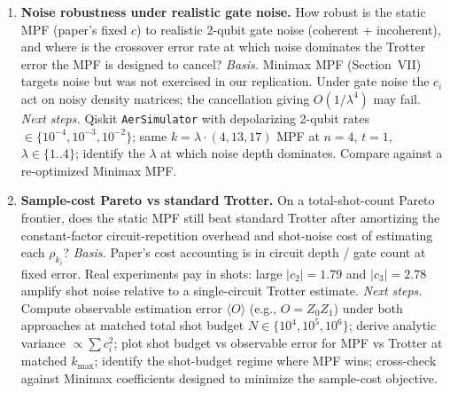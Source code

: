 \begin{enumerate}
\item \textbf{Noise robustness under realistic gate noise.}
How robust is the static MPF (paper's fixed $c$) to realistic 2-qubit gate noise (coherent +
incoherent), and where is the crossover error rate at which noise dominates the Trotter error the
MPF is designed to cancel?
\emph{Basis.} Minimax MPF (Section~VII) targets noise but was not exercised in our replication.
Under gate noise the $c_i$ act on noisy density matrices; the cancellation giving $O(1/\lambda^4)$
may fail.
\emph{Next steps.} Qiskit \texttt{AerSimulator} with depolarizing 2-qubit rates
$\in \{10^{-4}, 10^{-3}, 10^{-2}\}$; same $k = \lambda\cdot(4,13,17)$ MPF at $n=4$, $t=1$,
$\lambda \in \{1..4\}$; identify the $\lambda$ at which noise depth dominates. Compare against a
re-optimized Minimax MPF.

\item \textbf{Sample-cost Pareto vs standard Trotter.}
On a total-shot-count Pareto frontier, does the static MPF still beat standard Trotter after
amortizing the constant-factor circuit-repetition overhead and shot-noise cost of estimating each
$\rho_{k_i}$?
\emph{Basis.} Paper's cost accounting is in circuit depth / gate count at fixed error. Real
experiments pay in shots: large $|c_2| = 1.79$ and $|c_3| = 2.78$ amplify shot noise relative to a
single-circuit Trotter estimate.
\emph{Next steps.} Compute observable estimation error $\langle O \rangle$ (e.g., $O = Z_0 Z_1$)
under both approaches at matched total shot budget $N \in \{10^4, 10^5, 10^6\}$; derive analytic
variance $\propto \sum c_i^2$; plot shot budget vs observable error for MPF vs Trotter at matched
$k_{\max}$; identify the shot-budget regime where MPF wins; cross-check against Minimax coefficients
designed to minimize the sample-cost objective.

\end{enumerate}
